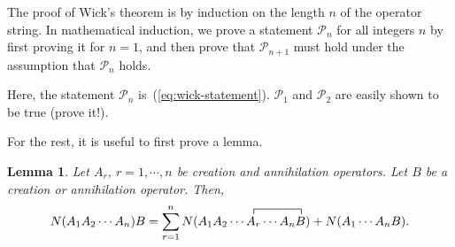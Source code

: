 \documentclass{report}
\theoremstyle{plain}
\newtheorem{lemma}{Lemma}[chapter]
\theoremstyle{definition}
\begin{document}
The proof of Wick's theorem is by induction on the length $n$ of the
operator string. In mathematical induction, we prove a
statement $\mathcal{P}_n$ for all integers $n$ by first proving it for
$n=1$, and then prove that $\mathcal{P}_{n+1}$ must hold under the
assumption that $\mathcal{P}_n$ holds.

Here, the statement $\mathcal{P}_n$
is~(\ref{eq:wick-statement}). $\mathcal{P}_1$ and $\mathcal{P}_2$ are
easily shown to be true (prove it!).

For the rest, it is useful to first prove a lemma.
\begin{lemma}\label{lemma:lemma-for-wick}
  Let $A_r$, $r=1,\cdots,n$ be creation and annihilation
  operators. Let $B$ be a creation or annihilation operator. Then,
\begin{equation}
  N(A_1 A_2 \cdots A_n) B = \sum_{r=1}^n N(A_1 A_2 \cdots
  \contraction{}{A_r}{\cdots A_n}{B} A_r \cdots A_n B) + N(A_1\cdots
  A_n B). \label{eq:lemma-statement}
\end{equation}
\end{lemma}
\end{document}
